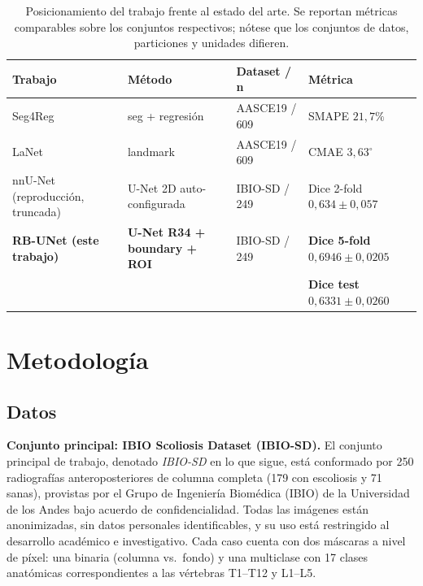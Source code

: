 \documentclass[conference]{IEEEtran}
\begin{document}
\begin{table}[htbp]
\caption{Posicionamiento del trabajo frente al estado del arte. Se reportan métricas comparables sobre los conjuntos respectivos; nótese que los conjuntos de datos, particiones y unidades difieren.}
\label{tab:comparacion}
\begin{center}
\renewcommand{\arraystretch}{1.15}
\begin{tabular}{@{}llll@{}}
\toprule
\textbf{Trabajo} & \textbf{Método} & \textbf{Dataset / n} & \textbf{Métrica} \\
\midrule
Seg4Reg \cite{seg4reg}        & seg + regresión & AASCE19 / 609 & SMAPE $21{,}7\%$  \\
LaNet \cite{lanet}            & landmark        & AASCE19 / 609 & CMAE $3{,}63^{\circ}$ \\
nnU-Net \cite{nnunet} (reproducción, truncada) & U-Net 2D auto-configurada & IBIO-SD / 249 & Dice 2-fold $0{,}634 \pm 0{,}057$ \\
\textbf{RB-UNet (este trabajo)} & \textbf{U-Net R34 + boundary + ROI} & IBIO-SD / 249 & \textbf{Dice 5-fold $0{,}6946 \pm 0{,}0205$} \\
                              &                 &               & \textbf{Dice test $0{,}6331 \pm 0{,}0260$} \\
\bottomrule
\end{tabular}
\end{center}
\end{table}

\section{Metodología}
\label{sec:metodologia}

\subsection{Datos}
\label{sec:datos}

\textbf{Conjunto principal: IBIO Scoliosis Dataset (IBIO-SD).} El conjunto principal de trabajo, denotado \emph{IBIO-SD} en lo que sigue, está conformado por 250 radiografías anteroposteriores de columna completa (179 con escoliosis y 71 sanas), provistas por el Grupo de Ingeniería Biomédica (IBIO) de la Universidad de los Andes bajo acuerdo de confidencialidad. Todas las imágenes están anonimizadas, sin datos personales identificables, y su uso está restringido al desarrollo académico e investigativo. Cada caso cuenta con dos máscaras a nivel de píxel: una binaria (columna vs.\ fondo) y una multiclase con 17 clases anatómicas correspondientes a las vértebras T1--T12 y L1--L5.
\end{document}
